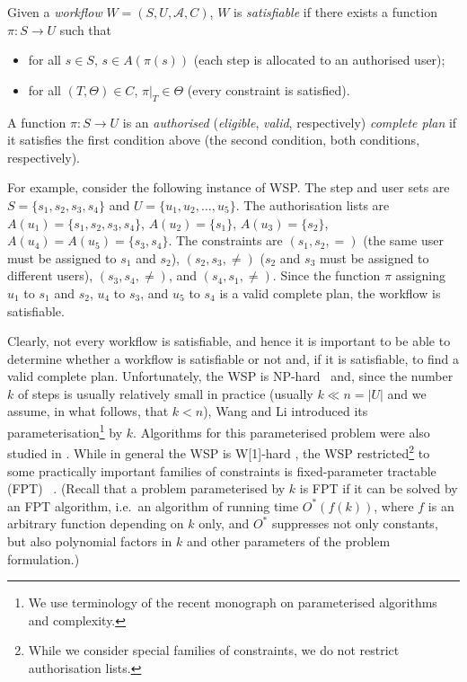 \documentclass[runningheads,proof]{llncs}
\begin{document}
Given a \emph{workflow} $W = (S, U, \mathcal{A}, C)$, $W$ is \emph{satisfiable} if there exists a function $\pi: S \rightarrow U$ such that
\begin{itemize}
\item for all $s \in S$, $s \in A(\pi(s))$ (each step is allocated to an authorised user);
\item for all $(T,\Theta) \in C$, $\pi|_{T}  \in \Theta$ (every constraint is satisfied).
\end{itemize}
A function $\pi: S \rightarrow U$ is an \emph{authorised} (\emph{eligible}, \emph{valid}, respectively) \emph{complete plan} if it satisfies the first condition above (the second condition, both conditions, respectively).



For example, consider the following instance of WSP\@.
The step and user sets are $S = \{ s_1, s_2, s_3, s_4 \}$ and $U = \{u_1,u_2, \dots, u_5\}$. 
The authorisation lists are $A(u_1) = \{ s_1, s_2, s_3, s_4 \}$, $A(u_2) = \{ s_1 \}$, $A(u_3) = \{ s_2 \}$, $A(u_4) = A(u_5) = \{ s_3, s_4 \}$. 
The constraints are $(s_1,s_2,=)$ (the same user must be assigned to $s_1$ and $s_2$), $(s_2, s_3,\neq)$ ($s_2$ and $s_3$ must be assigned to different users),  $(s_3, s_4,\neq)$, and $(s_4,s_1,\neq)$. 
Since the function $\pi$ assigning $u_1$ to $s_1$ and $s_2$, $u_4$ to $s_3$, and $u_5$ to $s_4$ is a valid complete plan, the workflow is satisfiable.  

Clearly, not every workflow is satisfiable, and hence
it is important to be able to determine whether a workflow is satisfiable or not and, if it is satisfiable, to find a valid complete plan.
Unfortunately, the WSP is  NP-hard~\cite{WaLi10} and, since the number $k$ of steps is usually relatively small in practice (usually $k\ll n=|U|$ and we assume, in what follows, that $k<n$), Wang and Li \cite{WaLi10} introduced its parameterisation\footnote{We use terminology of the recent monograph \cite{DoFe13} on parameterised algorithms and complexity.}  by $k$. Algorithms for this parameterised problem were also studied in \cite{FAW2014,CoCrGaGuJo13,JOCO2014,CrGuYe13}. While in general the WSP is W[1]-hard \cite{WaLi10}, 
the WSP restricted\footnote{While we consider special families of constraints, we do not restrict authorisation lists.} to some practically important families of constraints is fixed-parameter tractable (FPT) ~\cite{CoCrGaGuJo13,CrGuYe13,WaLi10}. (Recall that a problem parameterised by $k$ is FPT if it can be solved by an FPT algorithm, i.e.\ an algorithm of running time $O^*(f(k))$, where $f$ is an arbitrary function depending on $k$ only, and $O^*$ suppresses not only constants, but also polynomial factors in $k$ and other parameters of the problem formulation.)
\end{document}

